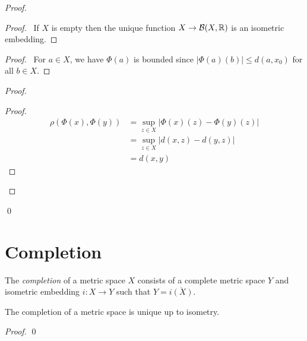 \begin{proof}
    \pf
    \begin{proof}
        \pf\ If $X$ is empty then the unique function $X \rightarrow \mathcal{B}(X, \mathbb{R})$ is an isometric embedding.
    \end{proof}
    \begin{proof}
        \pf\ For $a \in X$, we have $\Phi(a)$ is bounded since $|\Phi(a)(b)| \leq d(a,x_0)$ for all $b \in X$.
    \end{proof}
    \begin{proof}
        \begin{proof}
            \pf
            \begin{align*}
                \rho(\Phi(x),\Phi(y)) & = \sup_{z \in X} |\Phi(x)(z) - \Phi(y)(z)| \\
                & = \sup_{z \in X}|d(x,z) - d(y,z)| \\
                & = d(x,y)
            \end{align*}
        \end{proof}
    \end{proof}
    \qed
\end{proof}

\section{Completion}

\begin{definition}[Completion]
    The \emph{completion} of a metric space $X$ consists of a complete metric space $Y$ and isometric embedding
    $i : X \rightarrow Y$ such that $Y = \overline{i(X)}$.
\end{definition}

\begin{theorem}
    The completion of a metric space is unique up to isometry.
\end{theorem}

\begin{proof}
    \pf
    \qed
\end{proof}

